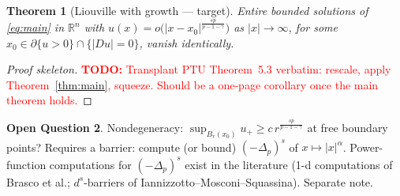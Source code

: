 \documentclass[11pt]{amsart}
\theoremstyle{plain}
\newtheorem{theorem}{Theorem}[section]
\theoremstyle{definition}
\newtheorem{question}[theorem]{Open Question}
\theoremstyle{remark}
\newcommand{\R}{\mathbb{R}}
\newcommand{\fpl}[1]{(-\Delta_p)^{s}#1}            %
\newcommand{\al}{\alpha}
\newcommand{\TODO}[1]{\textcolor{red}{\textbf{TODO:} #1}}
\begin{document}
\begin{theorem}[Liouville with growth --- target]
Entire bounded solutions of \eqref{eq:main} in $\R^n$ with
$u(x)=o\big(|x-x_0|^{\frac{sp}{p-1-\gamma}}\big)$ as $|x|\to\infty$, for
some $x_0\in\partial\{u>0\}\cap\{|Du|=0\}$, vanish identically.
\end{theorem}
\begin{proof}[Proof skeleton]
\TODO{Transplant PTU Theorem~5.3 verbatim: rescale, apply
Theorem~\ref{thm:main}, squeeze. Should be a one-page corollary once the
main theorem holds.}
\end{proof}
\begin{question}
Nondegeneracy: $\sup_{B_r(x_0)}u_+\ge c\,r^{\frac{sp}{p-1-\gamma}}$ at
free boundary points? Requires a barrier: compute (or bound) $\fpl{}$ of
$x\mapsto |x|^{\al}$. Power-function computations for $\fpl{}$ exist in
the literature (1-d computations of Brasco et al.; $d^s$-barriers of
Iannizzotto--Mosconi--Squassina). Separate note.
\end{question}
\end{document}
